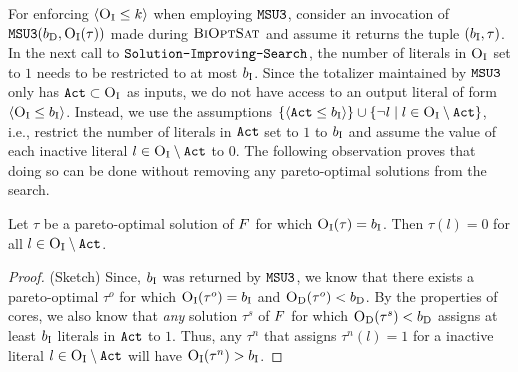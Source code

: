 For enforcing $\langle \textsc{O}_{\text{I}} \leq k \rangle$ when employing $\texttt{MSU3}$,
consider an invocation of $\texttt{MSU3}(b_{\text{D}} , \textsc{O}_{\text{I}}(\tau))$ made during $\textsc{BiOptSat}$ and assume it returns the tuple $(b_{\text{I}}, \tau)$. 
In the next call to $\texttt{Solution-\allowbreak{}Improving-\allowbreak{}Search}$, the number of literals in $\textsc{O}_{\text{I}}$ set to $1$ needs to be restricted to at most $b_{\text{I}}$. 
Since the totalizer maintained by $\texttt{MSU3}$ only has $\texttt{Act} \subset \textsc{O}_{\text{I}}$ 
as inputs, we do not have access to an output literal of form  $\langle \textsc{O}_{\text{I}} \leq b_{\text{I}} \rangle$. Instead, we use  the assumptions 
$\{\langle \texttt{Act} \leq b_{\text{I}} \rangle\} \cup \{ \lnot l \mid l \in \textsc{O}_{\text{I}} \setminus \texttt{Act} \}$, i.e., restrict the number of literals in $\texttt{Act}$ set to $1$ to $b_{\text{I}}$ and assume the 
value of each inactive literal $l \in \textsc{O}_{\text{I}} \setminus \texttt{Act}$ to $0$. 
The following observation proves that doing so can be done without removing any pareto-optimal solutions from the search. 
\begin{observation}\label{obs:sound}
Let $\tau$ be a pareto-optimal solution of $F$ for which $\textsc{O}_{\text{I}}(\tau) = b_{\text{I}}$.
Then $\tau(l) = 0$ for all $l \in \textsc{O}_{\text{I}} \setminus \texttt{Act}$. 
\end{observation}
\begin{proof}(Sketch)
Since, $b_{\text{I}}$ was returned by $\texttt{MSU3}$, we know that there exists a pareto-optimal $\tau^o$ for which $\textsc{O}_{\text{I}}(\tau^o) = b_{\text{I}}$ and $\textsc{O}_{\text{D}}(\tau^o) < b_{\text{D}}$.
By the properties of cores, we also know that \emph{any} solution $\tau^s$ of $F$ for which $\textsc{O}_{\text{D}}(\tau^s) < b_{\text{D}}$ 
assigns at least $b_{\text{I}}$ literals in $\texttt{Act}$ to $1$. Thus, any $\tau^n$ that assigns $\tau^n(l) = 1$ for a inactive literal $l \in  \textsc{O}_{\text{I}} \setminus \texttt{Act}$ will have 
$\textsc{O}_{\text{I}}(\tau^n) > b_{\text{I}}$.
\end{proof}



